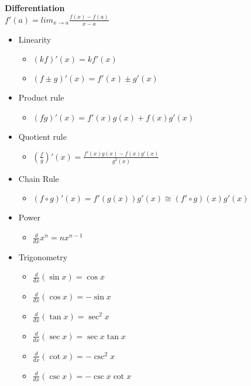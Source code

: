 \documentclass[10pt, a4paper]{article}
\begin{document}
\begin{multicols*}{3}
		{\normalsize\textbf{Differentiation}}\\ %
		$f'(a) = lim_{x \to a} \frac{f(x) - f(a)}{x - a}$
		\begin{itemize}
			\setlength\itemsep{0em}
			\item Linearity
			\begin{itemize}
				\setlength\itemsep{0em}
				\item $(kf)'(x) = kf'(x)$
				\item $(f \pm g)'(x) = f'(x) \pm g'(x)$ 
			\end{itemize}
			\item Product rule
				\begin{itemize}
					\setlength{\itemindent}{-2em}
					\item $(fg)'(x) = f'(x)g(x) + f(x)g'(x)$
				\end{itemize}
			\item Quotient rule 
				\begin{itemize}
					\setlength{\itemindent}{-2em}
					\item $\left(\frac{f}{g}\right)'(x) = \frac{f'(x)g(x) - f(x)g'(x)}{g^2(x)}$
				\end{itemize}
			\item Chain Rule
				\begin{itemize}
					\setlength{\itemindent}{-2em}
					\item $(f \circ g)'(x) = f'(g(x))g'(x) \cong (f' \circ g)(x)g'(x)$
				\end{itemize}
			\item Power
				\begin{itemize}
					\setlength{\itemindent}{-2em}
					\item $\frac{d}{dx}x^n = nx^{n - 1}$ 
				\end{itemize}		
			\item Trigonometry
				\begin{itemize}
					\setlength{\itemindent}{-2em}
					\setlength\itemsep{0em}
					\item $\frac{d}{dx}(\sin x) = \cos x$
					\item $\frac{d}{dx}(\cos x) = -\sin x$
					\item $\frac{d}{dx}(\tan x) =  \sec^2 x$
					\item $\frac{d}{dx}(\sec x) = \sec x \tan x$
					\item $\frac{d}{dx}(\cot x) = -\csc^2 x$
					\item $\frac{d}{dx}(\csc x) = -\csc x \cot x$ 
				\end{itemize} 

\end{itemize}
\end{multicols*}
\end{document}
